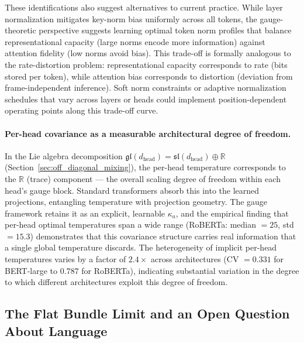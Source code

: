 \documentclass[twoside,11pt]{article}
\begin{document}
These identifications also suggest alternatives to current practice. While layer normalization mitigates key-norm bias uniformly across all tokens, the gauge-theoretic perspective suggests learning optimal token norm profiles that balance representational capacity (large norms encode more information) against attention fidelity (low norms avoid bias). This trade-off is formally analogous to the rate-distortion problem: representational capacity corresponds to rate (bits stored per token), while attention bias corresponds to distortion (deviation from frame-independent inference). Soft norm constraints or adaptive normalization schedules that vary across layers or heads could implement position-dependent operating points along this trade-off curve.

\paragraph{Per-head covariance as a measurable architectural degree of freedom.}
In the Lie algebra decomposition $\mathfrak{gl}(d_{\text{head}}) = \mathfrak{sl}(d_{\text{head}}) \oplus \mathbb{R}$ (Section~\ref{sec:off_diagonal_mixing}), the per-head temperature corresponds to the $\mathbb{R}$ (trace) component --- the overall scaling degree of freedom within each head's gauge block. Standard transformers absorb this into the learned projections, entangling temperature with projection geometry. The gauge framework retains it as an explicit, learnable $\kappa_a$, and the empirical finding that per-head optimal temperatures span a wide range (RoBERTa: median $= 25$, std $= 15.3$) demonstrates that this covariance structure carries real information that a single global temperature discards. The heterogeneity of implicit per-head temperatures varies by a factor of $2.4\times$ across architectures (CV $= 0.331$ for BERT-large to $0.787$ for RoBERTa), indicating substantial variation in the degree to which different architectures exploit this degree of freedom.

\subsection{The Flat Bundle Limit and an Open Question About Language}
\label{sec:flat_bundle}
\end{document}
